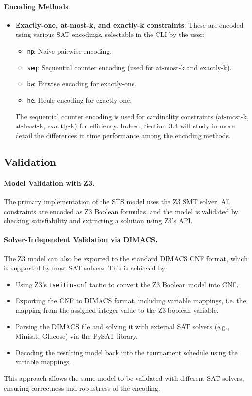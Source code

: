 \documentclass[11pt]{article}
\begin{document}
\paragraph{Encoding Methods}
\begin{itemize}
    \item \textbf{Exactly-one, at-most-k, and exactly-k constraints:} These are encoded using various SAT encodings, selectable in the CLI by the user:
    \begin{itemize}
        \item \texttt{np}: Naive pairwise encoding.
        \item \texttt{seq}: Sequential counter encoding (used for at-most-k and exactly-k).
        \item \texttt{bw}: Bitwise encoding for exactly-one.
        \item \texttt{he}: Heule encoding for exactly-one.
    \end{itemize}
    The sequential counter encoding is used for cardinality constraints (at-most-k, at-least-k, exactly-k) for efficiency. Indeed, Section~3.4 will study in more detail the differences in time performance among the encoding methods.
\end{itemize}

\subsection{Validation}

\paragraph{Model Validation with Z3.}
The primary implementation of the STS model uses the Z3 SMT solver. All constraints are encoded as Z3 Boolean formulas, and the model is validated by checking satisfiability and extracting a solution using Z3's API.

\paragraph{Solver-Independent Validation via DIMACS.} The Z3 model can also be exported to the standard DIMACS CNF format, which is supported by most SAT solvers. This is achieved by:
\begin{itemize}
    \item Using Z3's \texttt{tseitin-cnf} tactic \cite{tseitin} to convert the Z3 Boolean model into CNF.
    \item Exporting the CNF to DIMACS format, including variable mappings, i.e. the mapping from the assigned integer value to the Z3 boolean variable.
    \item Parsing the DIMACS file and solving it with external SAT solvers (e.g., Minisat, Glucose) via the PySAT library.
    \item Decoding the resulting model back into the tournament schedule using the variable mappings.
\end{itemize}
This approach allows the same model to be validated with different SAT solvers, ensuring correctness and robustness of the encoding.
\end{document}
